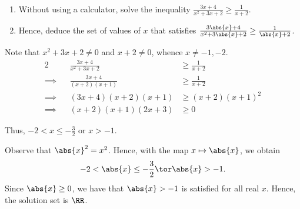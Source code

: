 \begin{problem}
    \begin{enumerate}
        \item Without using a calculator, solve the inequality $\frac{3x+4}{x^2+3x+2} \geq \frac{1}{x+2}$.
        \item Hence, deduce the set of values of $x$ that satisfies $\frac{3\abs{x}+4}{x^2+3\abs{x}+2} \geq \frac{1}{\abs{x}+2}$.
    \end{enumerate}
\end{problem}
\begin{solution}
    \begin{ppart}
        Note that $x^2 + 3x + 2 \neq 0$ and $x + 2 \neq 0$, whence $x \neq -1, -2$.
        \begin{alignat*}{2}
            &&\frac{3x+4}{x^2+3x+2} &\geq \frac{1}{x+2}\\
            \implies&& \frac{3x+4}{(x+2)(x+1)} &\geq \frac{1}{x+2}\\
            \implies&& (3x+4)(x+2)(x+1) &\geq (x+2)(x+1)^2 \\
            \implies&& (x+2)(x+1)(2x+3) &\geq 0
        \end{alignat*}
        \begin{center}
        \end{center}
        Thus, $-2 < x \leq -\frac32$ or $x > -1$.
    \end{ppart}
    \begin{ppart}
        Observe that $\abs{x}^2 = x^2$. Hence, with the map $x \mapsto \abs{x}$, we obtain \[-2 < \abs{x} \leq -\frac32 \tor \abs{x} > -1.\] Since $\abs{x} \geq 0$, we have that $\abs{x} > -1$ is satisfied for all real $x$. Hence, the solution set is $\RR$.
    \end{ppart}
\end{solution}    

